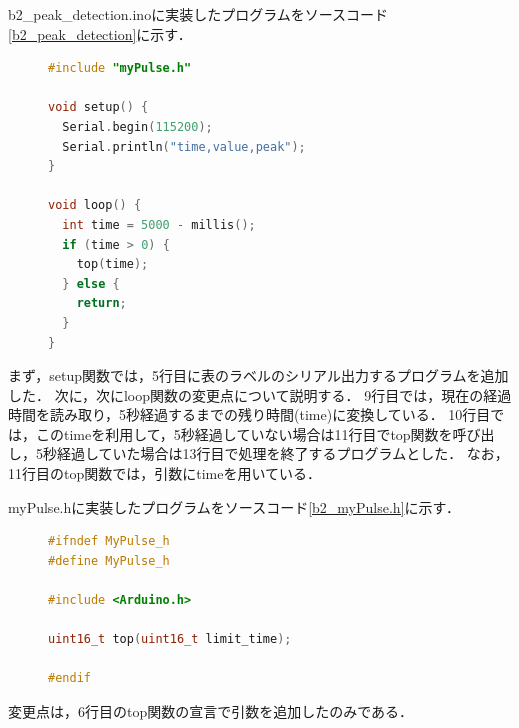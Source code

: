 b2\_peak\_detection.inoに実装したプログラムをソースコード\ref{b2_peak_detection}に示す．
\begin{figure}[H]
    \begin{lstlisting}[caption=b2\_peak\_detection.ino, label=b2_peak_detection, escapechar=\@, language=c++]
#include "myPulse.h"

void setup() {
  Serial.begin(115200);
  Serial.println("time,value,peak");
}

void loop() {
  int time = 5000 - millis();
  if (time > 0) {
    top(time);
  } else {
    return;
  }
}
    \end{lstlisting}
\end{figure}
まず，setup関数では，5行目に表のラベルのシリアル出力するプログラムを追加した．
次に，次にloop関数の変更点について説明する．
9行目では，現在の経過時間を読み取り，5秒経過するまでの残り時間(time)に変換している．
10行目では，このtimeを利用して，5秒経過していない場合は11行目でtop関数を呼び出し，5秒経過していた場合は13行目で処理を終了するプログラムとした．
なお，11行目のtop関数では，引数にtimeを用いている．



myPulse.hに実装したプログラムをソースコード\ref{b2_myPulse.h}に示す．
\begin{figure}[H]
        \begin{lstlisting}[caption=myPulse.h, label=b2_myPulse.h, escapechar=\@, language=c++]
#ifndef MyPulse_h
#define MyPulse_h

#include <Arduino.h>

uint16_t top(uint16_t limit_time);

#endif    
    \end{lstlisting}
\end{figure}
変更点は，6行目のtop関数の宣言で引数を追加したのみである．


\newpage

